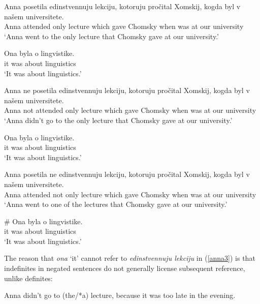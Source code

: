 \begin{exe}
	\ex \label{anna1} \begin{xlist}
		\ex \gll Anna posetila edinstvennuju lekciju, kotoruju pro\v{c}ital Xomskij, kogda byl v na\v{s}em universitete.\\
		Anna attended only lecture which gave Chomsky when was at our university\\
		\glt `Anna went to the only lecture that Chomsky gave at our university.'

		\ex \gll Ona byla o lingvistike.\\
		it was about linguistics\\
		\glt `It was about linguistics.'
	\end{xlist}

	\ex \label{anna2} \begin{xlist}
		\ex \gll Anna ne posetila edinstvennuju lekciju, kotoruju pro\v{c}ital Xomskij, kogda byl v na\v{s}em universitete.\\
		Anna not attended only lecture which gave Chomsky when was at our university\\
		\glt `Anna didn't go to the only lecture that Chomsky gave at our university.'

		\ex \gll Ona byla o lingvistike.\\
		it was about linguistics\\
		\glt `It was about linguistics.'
	\end{xlist}

	\ex \label{anna3} \begin{xlist}
		\ex \gll Anna posetila ne edinstvennuju lekciju, kotoruju pro\v{c}ital Xomskij, kogda byl v na\v{s}em universitete.\\
		Anna attended not only lecture which gave Chomsky when was at our university\\
		\glt `Anna went to one of the lectures that Chomsky gave at our university.'

		\ex \gll \# Ona byla o lingvistike.\\
		{} it was about linguistics\\
		\glt `It was about linguistics.'
	\end{xlist}
\end{exe}

The reason that \textit{ona} `it' cannot refer to \textit{edinstvennuju lekciju} in (\ref{anna3}) is that indefinites in negated sentences do not generally license subsequent reference, unlike definites:

\begin{exe}
	\ex Anna didn't go to (the/*a) lecture, because it was too late in the evening.
\end{exe}


